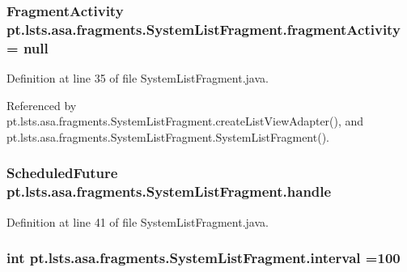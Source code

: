 \subsubsection[{fragment\+Activity}]{\setlength{\rightskip}{0pt plus 5cm}Fragment\+Activity pt.\+lsts.\+asa.\+fragments.\+System\+List\+Fragment.\+fragment\+Activity = null\hspace{0.3cm}{\ttfamily [private]}}\label{classpt_1_1lsts_1_1asa_1_1fragments_1_1SystemListFragment_aac7b772fe4d6f717eac3d51d0ea59a63}


Definition at line 35 of file System\+List\+Fragment.\+java.



Referenced by pt.\+lsts.\+asa.\+fragments.\+System\+List\+Fragment.\+create\+List\+View\+Adapter(), and pt.\+lsts.\+asa.\+fragments.\+System\+List\+Fragment.\+System\+List\+Fragment().

\hypertarget{classpt_1_1lsts_1_1asa_1_1fragments_1_1SystemListFragment_a9e029280f5b4d3f021759c3f04e24c5d}{}
\subsubsection[{handle}]{\setlength{\rightskip}{0pt plus 5cm}Scheduled\+Future pt.\+lsts.\+asa.\+fragments.\+System\+List\+Fragment.\+handle\hspace{0.3cm}{\ttfamily [private]}}\label{classpt_1_1lsts_1_1asa_1_1fragments_1_1SystemListFragment_a9e029280f5b4d3f021759c3f04e24c5d}


Definition at line 41 of file System\+List\+Fragment.\+java.

\hypertarget{classpt_1_1lsts_1_1asa_1_1fragments_1_1SystemListFragment_a0e16295942ad809a73c61d9ed9cd7684}{}
\subsubsection[{interval}]{\setlength{\rightskip}{0pt plus 5cm}int pt.\+lsts.\+asa.\+fragments.\+System\+List\+Fragment.\+interval =100\hspace{0.3cm}{\ttfamily [private]}}\label{classpt_1_1lsts_1_1asa_1_1fragments_1_1SystemListFragment_a0e16295942ad809a73c61d9ed9cd7684}


